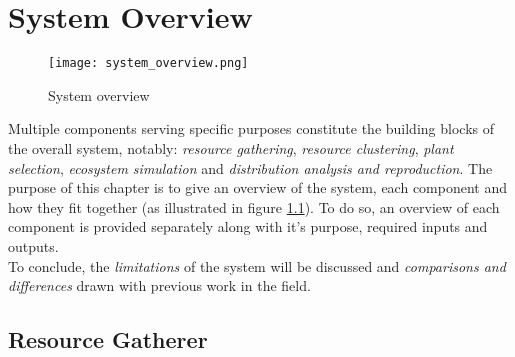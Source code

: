 \chapter{System Overview} \label{chap:system_overview}

\begin{figure}
\center
	\texttt{[image: system\_overview.png]}
	\caption{ System overview}	
	\label{fig:system_overview}
\end{figure}

Multiple components serving specific purposes constitute the building blocks of the overall system, notably: \textit{resource gathering}, \textit{resource clustering}, \textit{plant selection}, \textit{ecosystem simulation} and \textit{distribution analysis and reproduction}. The purpose of this chapter is to give an overview of the system, each component and how they fit together (as illustrated in figure \ref{fig:system_overview}). To do so, an overview of each component is provided separately along with it's purpose, required inputs and outputs.\\
To conclude, the \textit{limitations} of the system will be discussed and \textit{comparisons and differences} drawn with previous work in the field.

\section{Resource Gatherer} \label{sec:resource_gatherer}

